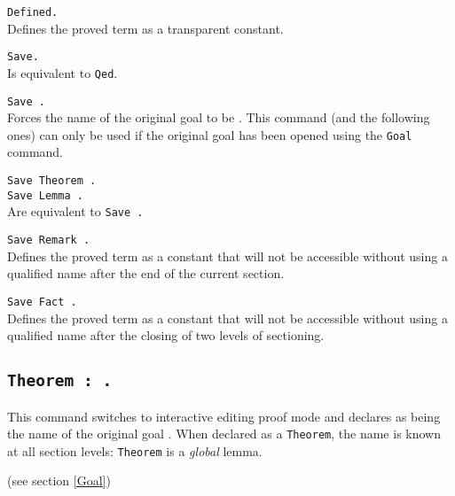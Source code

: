 \begin{Variants}
\item {\tt Defined.} \label{Defined} \\
  Defines the proved term as a transparent constant.
\item {\tt Save.}\\
  Is equivalent to {\tt Qed}.
\item {\tt Save {\ident}.}\\ Forces the name of the original goal to
be {\ident}.  This command (and the following ones) can only be used
if the original goal has been opened using the {\tt Goal} command.
\item {\tt Save Theorem {\ident}.} \\
 {\tt Save Lemma {\ident}.} \\
  Are equivalent to {\tt Save {\ident}.}
\item {\tt Save Remark {\ident}.}\\
  Defines the proved term as a constant that will not be accessible
  without using a qualified name after the end of the current section.
\item {\tt Save Fact {\ident}.}\\
  Defines the proved term as a constant that will not be accessible
  without using a qualified name after the closing of two levels of sectioning.
\end{Variants}

\subsection{\tt Theorem {\ident} : {\form}.}\label{Theorem}
This command switches to interactive editing proof mode and declares
{\ident} as being the name of the original goal {\form}. When declared
as a {\tt Theorem}, the name {\ident} is known at all section levels:
{\tt Theorem} is a {\sl global} lemma.

\ErrMsg (see section \ref{Goal})

